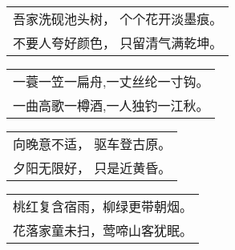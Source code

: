 \noindent\begin{minipage}{\linewidth}
  \vskip-3pt\begin{table}[H]
    \centering
    \begin{tabular}{@{}l@{}}
吾家洗砚池头树， 个个花开淡墨痕。\\
不要人夸好颜色， 只留清气满乾坤。
    \end{tabular}
  \end{table}
\end{minipage}
\vspace{1cm}


\noindent\begin{minipage}{\linewidth}
  \vskip-3pt\begin{table}[H]
    \centering
    \begin{tabular}{@{}l@{}}
一蓑一笠一扁舟,一丈丝纶一寸钩。\\
一曲高歌一樽酒,一人独钓一江秋。
    \end{tabular}
  \end{table}
\end{minipage}
\vspace{1cm}


\noindent\begin{minipage}{\linewidth}
  \vskip-3pt\begin{table}[H]
    \centering
    \begin{tabular}{@{}l@{}}
向晚意不适， 驱车登古原。\\
夕阳无限好， 只是近黄昏。
    \end{tabular}
  \end{table}
\end{minipage}
\vspace{1cm}


\noindent\begin{minipage}{\linewidth}
  \vskip-3pt\begin{table}[H]
    \centering
    \begin{tabular}{@{}l@{}}
桃红复含宿雨，柳绿更带朝烟。\\
花落家童未扫，莺啼山客犹眠。
    \end{tabular}
  \end{table}
\end{minipage}
\vspace{1cm}


